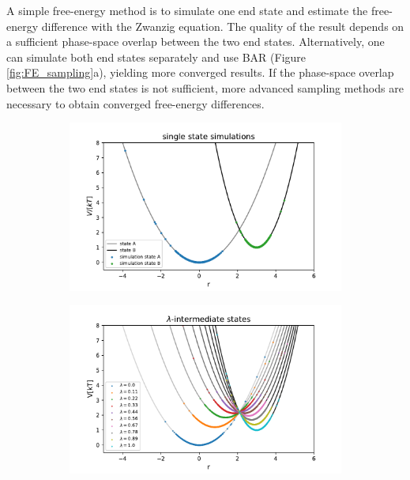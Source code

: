 A simple free-energy method is to simulate one end state and estimate the free-energy difference with the Zwanzig equation.\cite{Zwanzig1954} The quality of the result depends on a sufficient phase-space overlap between the two end states.\cite{Konig2018}
Alternatively, one can simulate both end states separately and use BAR\cite{Bennett1976} (Figure \ref{fig:FE_sampling}a), yielding more converged results.\cite{Konig2018}
If the phase-space overlap between the two end states is not sufficient, more advanced sampling methods are necessary to obtain converged free-energy differences.
%
\begin{figure}
	\centering
	\begin{subfigure}{.45\textwidth}
		\caption{}
		\includegraphics[width=\linewidth]{fig/FE_example/freeEnergyPertubation.pdf} 
	\end{subfigure}
	\begin{subfigure}{.45\textwidth}
		\caption{}
		\includegraphics[width=\linewidth]{fig/FE_example/linear_coupled.pdf} 

\end{subfigure}
\end{figure}
